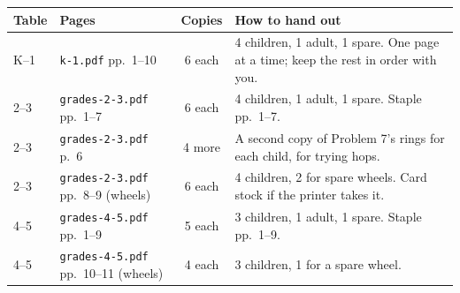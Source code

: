 \documentclass[11pt]{article}
\begin{document}
{\small\begin{tabularx}{\textwidth}{@{}l l c L@{}}
\toprule
Table & Pages & Copies & How to hand out \\
\midrule
K--1 & \texttt{k-1.pdf} pp.\ 1--10 & 6 each & 4 children, 1 adult, 1 spare. One page at a time; keep the rest in order with you. \\
2--3 & \texttt{grades-2-3.pdf} pp.\ 1--7 & 6 each & 4 children, 1 adult, 1 spare. Staple pp.\ 1--7. \\
2--3 & \texttt{grades-2-3.pdf} p.\ 6 & 4 more & A second copy of Problem 7's rings for each child, for trying hops. \\
2--3 & \texttt{grades-2-3.pdf} pp.\ 8--9 (wheels) & 6 each & 4 children, 2 for spare wheels. Card stock if the printer takes it. \\
4--5 & \texttt{grades-4-5.pdf} pp.\ 1--9 & 5 each & 3 children, 1 adult, 1 spare. Staple pp.\ 1--9. \\
4--5 & \texttt{grades-4-5.pdf} pp.\ 10--11 (wheels) & 4 each & 3 children, 1 for a spare wheel. \\
\bottomrule
\end{tabularx}}
\end{document}
